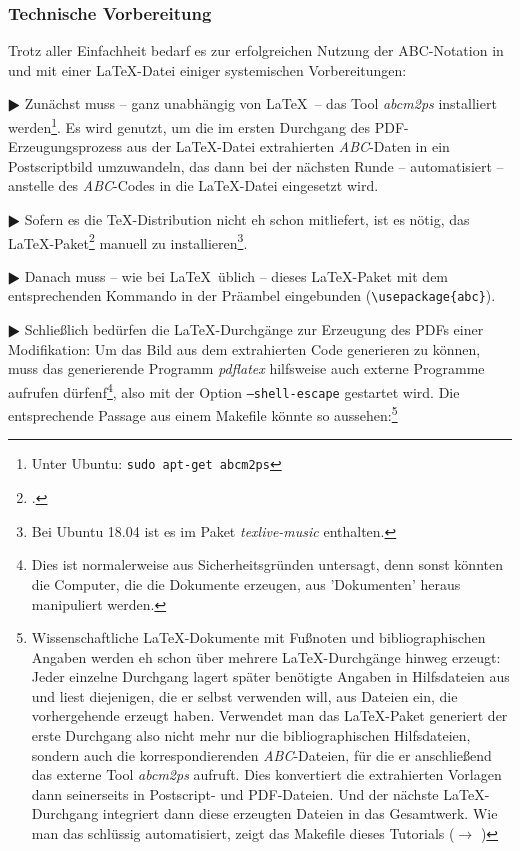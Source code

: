 \subsubsection{Technische Vorbereitung}

Trotz aller Einfachheit bedarf es zur erfolgreichen Nutzung der ABC-Notation
in und mit einer \LaTeX-Datei einiger systemischen Vorbereitungen:

$\RHD$ Zunächst muss -- ganz unabhängig von \LaTeX\ -- das Tool \textit{abcm2ps}
installiert werden\footnote{Unter Ubuntu: \texttt{sudo apt-get abcm2ps}}. Es
wird genutzt, um die im  ersten Durchgang des PDF-Erzeugungsprozess aus der
\LaTeX-Datei extrahierten \textit{ABC}-Daten in ein Postscriptbild
umzuwandeln, das dann bei der nächsten Runde -- automatisiert -- anstelle des
\textit{ABC}-Codes in die \LaTeX-Datei eingesetzt wird.
  
$\RHD$ Sofern es die \TeX-Distribution nicht eh schon mitliefert, ist es nötig,
das \LaTeX-Paket\footcite[vgl.][\nopage wp]{CtanAbc2018a} manuell zu
installieren\footnote{Bei Ubuntu 18.04 ist es im Paket \textit{texlive-music}
enthalten.}.
  
$\RHD$ Danach muss -- wie bei \LaTeX\ üblich -- dieses
\LaTeX-Paket  mit dem entsprechenden Kommando in der Präambel
eingebunden (\texttt{\textbackslash{usepackage}\{abc\}}).
  
$\RHD$ Schließlich bedürfen die \LaTeX-Durchgänge zur Erzeugung des PDFs einer
Modifikation: Um das Bild aus dem extrahierten Code generieren zu können, muss
das generierende Programm \textit{pdflatex} hilfsweise auch externe Programme
aufrufen dürfenf\footnote{Dies ist normalerweise aus Sicherheitsgründen
untersagt, denn sonst könnten die Computer, die die Dokumente erzeugen, aus
'Dokumenten' heraus manipuliert werden.}, also mit der Option
\texttt{--shell-escape} gestartet wird. Die entsprechende Passage aus einem
Makefile könnte so aussehen:\footnote{Wissenschaftliche \LaTeX-Dokumente mit
Fußnoten und bibliographischen Angaben werden eh schon über mehrere
\LaTeX-Durchgänge hinweg erzeugt: Jeder einzelne Durchgang lagert später
benötigte Angaben in Hilfsdateien aus und liest diejenigen, die er selbst
verwenden will, aus Dateien ein, die vorhergehende erzeugt haben. Verwendet man
das \LaTeX-Paket generiert der erste Durchgang also nicht mehr nur die
bibliographischen Hilfsdateien, sondern auch die korrespondierenden
\textit{ABC}-Dateien, für die er anschließend das externe Tool \textit{abcm2ps}
aufruft. Dies konvertiert die extrahierten Vorlagen dann seinerseits in
Postscript- und PDF-Dateien. Und der nächste \LaTeX-Durchgang integriert dann
diese erzeugten Dateien in das Gesamtwerk. Wie man das schlüssig automatisiert,
zeigt das Makefile dieses Tutorials ($\rightarrow$
) } 

